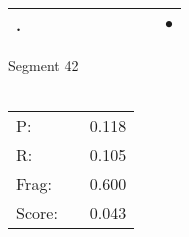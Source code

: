 \documentclass[landscape]{article}
\newcommand{\ssp}{\hspace{2pt}}
\newcommand{\mex}{\cellcolor{g}$\bullet$}
\begin{document}
\begin{tabular}{|l|p{10pt}|p{10pt}|p{10pt}|p{10pt}|p{10pt}|p{10pt}|p{10pt}|p{10pt}|p{10pt}|}
\hline
\ssp \cellcolor{ref8}. \ssp&\hspace{2pt}&\hspace{2pt}&\hspace{2pt}&\hspace{2pt}&\hspace{2pt}&\hspace{2pt}&\hspace{2pt}&\hspace{2pt}&\hspace{2pt}\mex\\
\hline
\end{tabular}

\vspace{6pt}
\noindent Segment 42\\\\
\noindent\begin{tabular}{lm{12pt}r}
\hline
P:&&0.118\\
R:&&0.105\\
Frag:&&0.600\\
Score:&&0.043\\
\end{tabular}

\newpage
\end{document}
